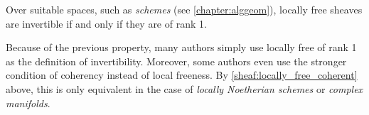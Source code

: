     
    \begin{property}
        Over suitable spaces, such as \textit{schemes} (see \cref{chapter:alggeom}), locally free sheaves are invertible if and only if they are of rank 1.
    \end{property}
    \begin{remark}
        Because of the previous property, many authors simply use locally free of rank 1 as the definition of invertibility. Moreover, some authors even use the stronger condition of coherency instead of local freeness. By \cref{sheaf:locally_free_coherent} above, this is only equivalent in the case of \textit{locally Noetherian schemes} or \textit{complex manifolds}.
    \end{remark}

